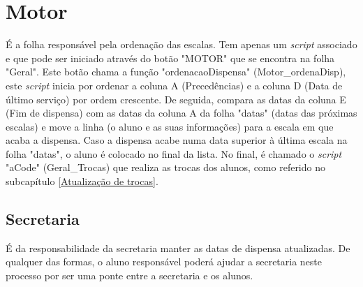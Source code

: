 \graphicspath{{Images/}}

\section{Motor}
\label{Motor}
É a folha responsável pela ordenação das escalas. Tem apenas um \textit{script} associado e que pode ser iniciado através do botão "MOTOR" que se encontra na folha "Geral". Este botão chama a função "ordenacaoDispensa" (Motor\_ordenaDisp), este \textit{script} inicia por ordenar a coluna A (Precedências) e a coluna D (Data de último serviço) por ordem crescente. De seguida, compara as datas da coluna E (Fim de dispensa) com as datas da coluna A da folha "datas" (datas das próximas escalas) e move a linha (o aluno e as suas informações) para a escala em que acaba a dispensa. Caso a dispensa acabe numa data superior à última escala na folha "datas", o aluno é colocado no final da lista. No final, é chamado o \textit{script} "aCode" (Geral\_Trocas) que realiza as trocas dos alunos, como referido no subcapítulo \ref{Atualização de trocas}.

\subsection{Secretaria}

É da responsabilidade da secretaria manter as datas de dispensa atualizadas. De qualquer das formas, o aluno responsável poderá ajudar a secretaria neste processo por ser uma ponte entre a secretaria e os alunos.